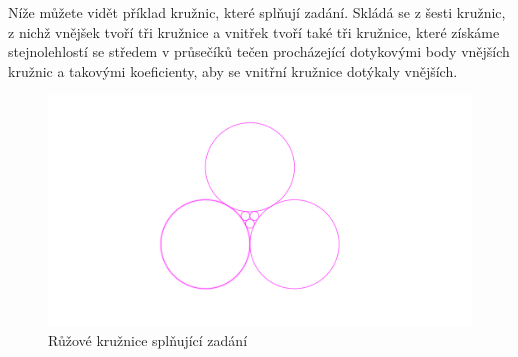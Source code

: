 \documentclass{fkssolpub}
\author{Ondřej Sedláček}
\begin{document}
 

Níže můžete vidět příklad kružnic, které splňují zadání. Skládá se z šesti kružnic,
z nichž vnějšek tvoří tři kružnice a vnitřek tvoří také tři kružnice, které získáme
stejnolehlostí se středem v průsečíků tečen procházející dotykovými body vnějších kružnic
a takovými koeficienty, aby se vnitřní kružnice dotýkaly vnějších.

\begin{figure}[h!]
  \centering
  \includegraphics{2-fig.png}
  \caption{Růžové kružnice splňující zadání}
\end{figure}
\end{document}
